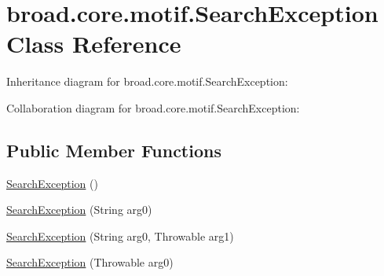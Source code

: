 \hypertarget{classbroad_1_1core_1_1motif_1_1_search_exception}{\section{broad.\+core.\+motif.\+Search\+Exception Class Reference}
\label{classbroad_1_1core_1_1motif_1_1_search_exception}
}


Inheritance diagram for broad.\+core.\+motif.\+Search\+Exception\+:


Collaboration diagram for broad.\+core.\+motif.\+Search\+Exception\+:
\subsection*{Public Member Functions}
\begin{DoxyCompactItemize}
\item 
\hyperlink{classbroad_1_1core_1_1motif_1_1_search_exception_a535f7156a0d1bd0dd2fb8b40f6287602}{Search\+Exception} ()
\item 
\hyperlink{classbroad_1_1core_1_1motif_1_1_search_exception_aa1fce4dc2a6b5369eba7cc49245825fc}{Search\+Exception} (String arg0)
\item 
\hyperlink{classbroad_1_1core_1_1motif_1_1_search_exception_a88fb1ab69dbd8b9ccfec2173ca129c03}{Search\+Exception} (String arg0, Throwable arg1)
\item 
\hyperlink{classbroad_1_1core_1_1motif_1_1_search_exception_a66cb85232855fdec404f1b5a24d7f837}{Search\+Exception} (Throwable arg0)
\end{DoxyCompactItemize}


